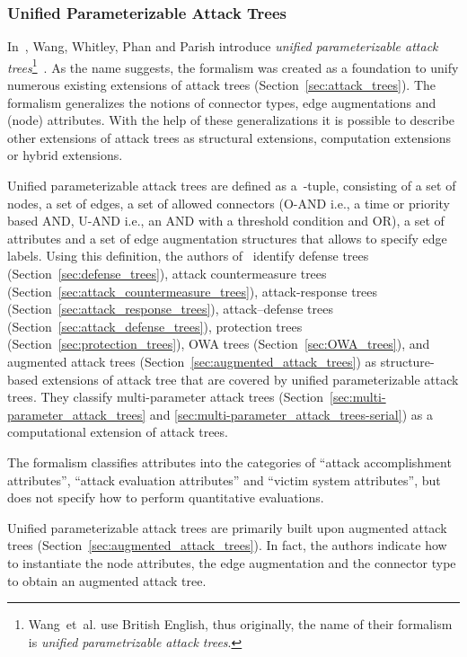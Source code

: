 \documentclass[a4paper]{article}
\begin{document}
\subsubsection{Unified Parameterizable Attack Trees} 
\label{sec:unified_parametrizable_attack_trees}

In~, Wang, Whitley, Phan and Parish introduce \emph{unified 
parameterizable attack trees}\footnote{Wang~et~al. use British English, thus
originally, the name of their formalism is \emph{unified parametrizable attack
trees}.}~\cite{WaWhPhPa}. As the name suggests, the formalism was created as a
foundation to unify numerous existing extensions of attack trees
(Section~\ref{sec:attack_trees}). The formalism generalizes the notions of
connector types, edge augmentations and (node) attributes. With the help of
these generalizations it is possible to describe other extensions of attack
trees as structural extensions, computation extensions or hybrid extensions.

Unified parameterizable attack trees are defined as a~-tuple, consisting of 
a set of nodes, a set of edges,  a set of allowed connectors (O-AND i.e., a time
or priority based AND, U-AND  i.e., an AND with a threshold condition and OR), a
set of attributes and a set  of edge augmentation structures that allows to
specify edge labels. Using this  definition, the authors of~\cite{WaWhPhPa}
identify defense trees (Section~\ref{sec:defense_trees}), attack countermeasure
trees (Section~\ref{sec:attack_countermeasure_trees}), attack-response trees
(Section~\ref{sec:attack_response_trees}), attack--defense trees
(Section~\ref{sec:attack_defense_trees}), protection trees
(Section~\ref{sec:protection_trees}), OWA trees (Section~\ref{sec:OWA_trees}),
and augmented attack trees (Section~\ref{sec:augmented_attack_trees}) as
structure-based extensions of attack tree that are covered by unified
parameterizable attack trees. They  classify multi-parameter attack  trees
(Section~\ref{sec:multi-parameter_attack_trees} and 
\ref{sec:multi-parameter_attack_trees-serial}) as a computational extension of
attack trees.

The formalism classifies attributes into the categories of ``attack
accomplishment attributes'', ``attack evaluation attributes'' and ``victim
system attributes'', but does not specify how to perform quantitative
evaluations.

Unified parameterizable attack trees are primarily built upon augmented attack 
trees (Section~\ref{sec:augmented_attack_trees}). In fact, the authors indicate
how to instantiate the node attributes, the edge augmentation and the connector 
type to obtain an augmented attack tree.
\end{document}
